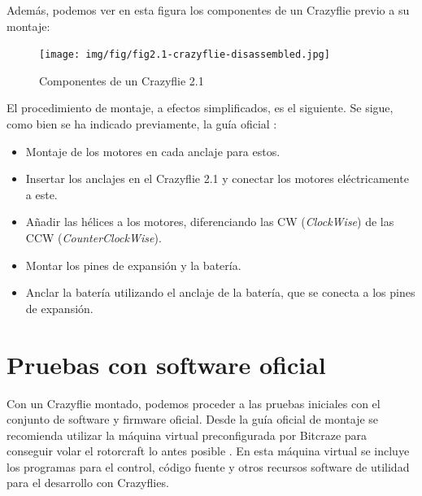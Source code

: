 Además, podemos ver en esta figura los componentes de un Crazyflie previo a su montaje:

\begin{figure}[h]
    \centering
    \texttt{[image: img/fig/fig2.1-crazyflie-disassembled.jpg]}
    \caption{Componentes de un Crazyflie 2.1}
    \label{fig:crazyflie_disassembled}
\end{figure}

El procedimiento de montaje, a efectos simplificados, es el siguiente. Se sigue, como bien se ha indicado previamente, 
la guía oficial \cite{crazyflie_assembly_and_quickstart}:

\begin{itemize}
    \item Montaje de los motores en cada anclaje para estos.
    \item Insertar los anclajes en el Crazyflie 2.1 y conectar los motores eléctricamente a este.
    \item Añadir las hélices a los motores, diferenciando las CW (\textit{ClockWise}) de las CCW (\textit{CounterClockWise}).
    \item Montar los pines de expansión y la batería.
    \item Anclar la batería utilizando el anclaje de la batería, que se conecta a los pines de expansión.
\end{itemize}


\section{Pruebas con software oficial}

Con un Crazyflie montado, podemos proceder a las pruebas iniciales con el conjunto de software y firmware oficial.
Desde la guía oficial de montaje se recomienda utilizar la máquina virtual preconfigurada por Bitcraze para conseguir
volar el rotorcraft lo antes posible \cite{bitcraze_vm}. En esta máquina virtual se incluye los programas para el control,
código fuente y otros recursos software de utilidad para el desarrollo con Crazyflies.


